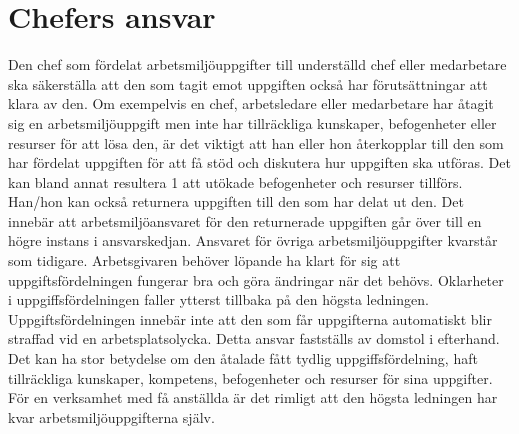 \section*{Chefers ansvar}
Den chef som fördelat arbetsmiljöuppgifter till underställd chef eller medarbetare ska säkerställa att den som tagit emot uppgiften också har förutsättningar att klara av den. Om exempelvis en chef, arbetsledare eller medarbetare har åtagit sig en arbetsmiljöuppgift men inte har tillräckliga kunskaper, befogenheter eller resurser för att lösa den, är det viktigt att han eller hon återkopplar till den som har fördelat uppgiften för att få stöd och diskutera hur uppgiften ska utföras. Det kan bland annat resultera 1 att utökade befogenheter och resurser tillförs. Han/hon kan också returnera uppgiften till den som har delat ut den. Det innebär att arbetsmiljöansvaret för den returnerade uppgiften går över till en högre instans i ansvarskedjan. Ansvaret för övriga arbetsmiljöuppgifter kvarstår som tidigare.
Arbetsgivaren behöver löpande ha klart för sig att uppgiftsfördelningen fungerar bra och göra ändringar när det behövs. Oklarheter i uppgiffsfördelningen faller ytterst tillbaka på den högsta ledningen.
Uppgiftsfördelningen innebär inte att den som får uppgifterna automatiskt blir straffad vid en arbetsplatsolycka. Detta ansvar fastställs av domstol i efterhand. Det kan ha stor betydelse om den åtalade fått tydlig uppgiffsfördelning, haft tillräckliga kunskaper, kompetens, befogenheter och resurser för sina uppgifter. För en verksamhet med få anställda är det rimligt att den högsta ledningen har kvar arbetsmiljöuppgifterna själv.

